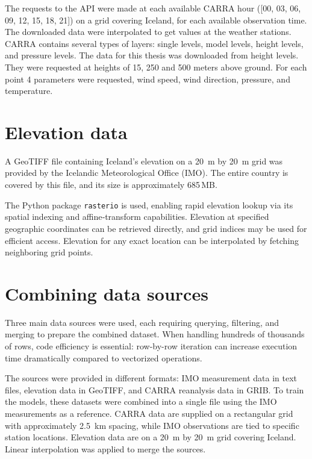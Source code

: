 The requests to the API were made at each available CARRA hour ([00, 03, 06, 09, 12, 15, 18, 21]) on a grid covering Iceland, for each available observation time. The downloaded data were interpolated to get values at the weather stations. CARRA contains several types of layers: single levels, model levels, height levels, and pressure levels. The data for this thesis was downloaded from height levels. They were requested at heights of 15, 250 and 500 meters above ground. For each point 4 parameters were requested, wind speed, wind direction, pressure, and temperature.

\section{Elevation data}
A GeoTIFF file containing Iceland’s elevation on a 20~m by 20~m grid was provided by the Icelandic Meteorological Office (IMO). The entire country is covered by this file, and its size is approximately 685\,MB.

The Python package \texttt{rasterio} is used, enabling rapid elevation lookup via its spatial indexing and affine‐transform capabilities. Elevation at specified geographic coordinates can be retrieved directly, and grid indices may be used for efficient access. Elevation for any exact location can be interpolated by fetching neighboring grid points.

\section{Combining data sources}

Three main data sources were used, each requiring querying, filtering, and merging to prepare the combined dataset. When handling hundreds of thousands of rows, code efficiency is essential: row-by-row iteration can increase execution time dramatically compared to vectorized operations.

The sources were provided in different formats: IMO measurement data in text files, elevation data in GeoTIFF, and CARRA reanalysis data in GRIB. To train the models, these datasets were combined into a single file using the IMO measurements as a reference. CARRA data are supplied on a rectangular grid with approximately 2.5~km spacing, while IMO observations are tied to specific station locations. Elevation data are on a 20~m by 20~m grid covering Iceland. Linear interpolation was applied to merge the sources.

